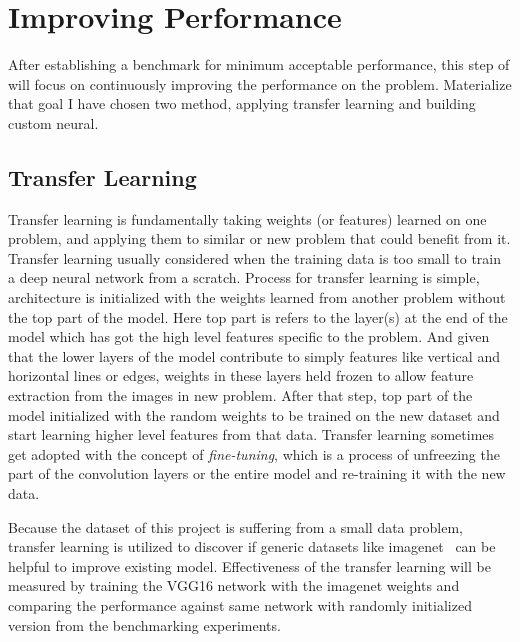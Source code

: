 
\section{Improving Performance}
After establishing a benchmark for minimum acceptable performance, this step of will focus on continuously improving the performance on the problem. 
Materialize that goal I have chosen two method, applying transfer learning and building custom neural.

\subsection{Transfer Learning} \label{subsec:transferlearning}
Transfer learning is fundamentally taking weights (or features) learned on one problem, and applying them to similar or new problem that could benefit from it.
Transfer learning usually considered when the training data is too small to train a deep neural network from a scratch.
Process for transfer learning is simple, architecture is initialized with the weights learned from another problem without the top part of the model.
Here top part is refers to the layer(s) at the end of the model which has got the high level features specific to the problem.
And given that the lower layers of the model contribute to simply features like vertical and horizontal lines or edges, weights in these layers held frozen to allow feature extraction from the images in new problem.
After that step, top part of the model initialized with the random weights to be trained on the new dataset and start learning higher level features from that data.
Transfer learning sometimes get adopted with the concept of \emph{fine-tuning}, which is a process of unfreezing the part of the convolution layers or the entire model and re-training it with the new data.

Because the dataset of this project is suffering from a small data problem, transfer learning is utilized to discover if generic datasets like imagenet~\cite{imagenet} can be helpful to improve existing model.
Effectiveness of the transfer learning will be measured by training the VGG16 network with the imagenet weights and comparing the performance against same network with randomly initialized version from the benchmarking experiments.

